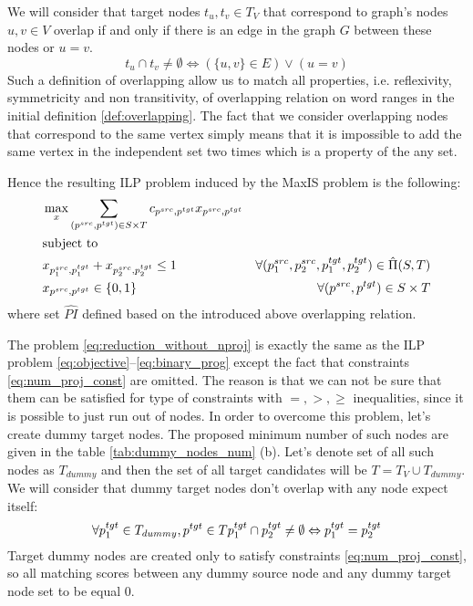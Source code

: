 We will consider that target nodes \( t_u, t_v \in T_{V} \) that correspond to graph's nodes \( u, v \in V \) overlap
if and only if there is an edge in the graph \( G \) between these nodes or \( u = v \).
\begin{equation} \label{eq:overlap_reduction}
  t_u \cap t_v \neq \emptyset \Leftrightarrow
  \left( \{ u, v \} \in E \right) \lor  \left(u = v \right)
\end{equation}
Such a definition of overlapping allow us to match all properties, i.e. reflexivity, symmetricity and non transitivity,
of overlapping relation on word ranges in the initial definition \ref{def:overlapping}. The fact that we consider
overlapping nodes that correspond to the same vertex simply means that it is impossible to
add the same vertex in the independent set two times which is a property of the any set.

Hence the resulting ILP problem induced by the MaxIS problem is the following:
\begin{equation} \label{eq:reduction_without_nproj}
  \begin{aligned}
    & \max\limits_x \sum\limits_{(p^{src}, p^{tgt}) \in S \times T} c_{p^{src}, p^{tgt}} x_{p^{src}, p^{tgt}}                                             \\
    & \text{subject to}                                                                                                                                   \\
    & x_{p_1^{src}, p_1^{tgt}} + x_{p_2^{src}, p_2^{tgt}} \leq 1
    & \forall (p_1^{src}, p_2^{src}, p_1^{tgt}, p_2^{tgt}) \in \hat{\Pi}(S, T)                                                                            \\
    & x_{p^{src}, p^{tgt}} \in \{ 0, 1 \}                                                                     & \forall (p^{src}, p^{tgt}) \in S \times T
  \end{aligned}
\end{equation}
where set \( \hat{PI} \) defined based on the introduced above overlapping relation.

The problem \eqref{eq:reduction_without_nproj} is exactly the same as the ILP problem \eqref{eq:objective}--\eqref{eq:binary_prog}
except the fact that constraints \eqref{eq:num_proj_const} are omitted. The reason is that we can not be sure
that them can be satisfied for type of constraints with \( =, >, \geq \) inequalities, since it is possible to just run out of nodes.
In order to overcome this problem, let's create dummy target nodes. The proposed minimum number of such nodes are given
in the table \ref{tab:dummy_nodes_num} (b). Let's denote set of all such nodes as \( T_{dummy} \) and then the set of all target candidates
will be \( T = T_V \cup T_{dummy} \). We will consider that dummy target nodes don't overlap with any node expect itself:
\[
  \forall p_1^{tgt} \in T_{dummy}, p^{tgt} \in T
  p_1^{tgt} \cap p_2^{tgt} \neq \emptyset \Leftrightarrow p_1^{tgt} = p_2^{tgt}
\]
Target dummy nodes are created only to satisfy constraints \eqref{eq:num_proj_const}, so all matching scores
between any dummy source node and any dummy target node set to be equal \( 0 \).


